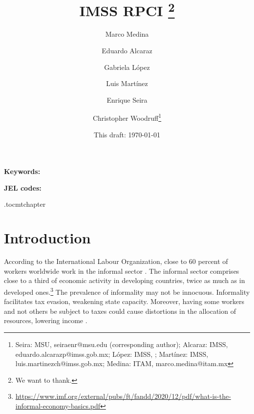 \documentclass[oneside,11pt]{article}
\begin{document}
\title{IMSS RPCI \thanks{We want to thank.}}
\author{Marco Medina \and Eduardo Alcaraz \and Gabriela López \and Luis Martínez \and Enrique Seira  \and Christopher Woodruff\thanks{Seira: MSU, seiraenr@msu.edu (corresponding author); Alcaraz: IMSS, eduardo.alcarazp@imss.gob.mx; López: IMSS, ; Martínez: IMSS, luis.martinezch@imss.gob.mx; Medina:  ITAM, marco.medina@itam.mx}}
\date{This draft:  \today \\[2 cm]}



\maketitle
\thispagestyle{empty}
\begin{abstract}


\end{abstract}

\vspace{.3in}

\textbf{Keywords: }

\textbf{JEL codes:}

\newpage

\etocdepthtag.toc{mtchapter}

\section{Introduction} \label{introduction}

According to the International Labour Organization, close to 60 percent of workers worldwide work in the informal sector \citep{ILO_2018}. The informal sector comprises close to a third of economic activity in developing countries, twice as much as in developed ones.\footnote{\url{https://www.imf.org/external/pubs/ft/fandd/2020/12/pdf/what-is-the-informal-economy-basics.pdf}} The prevalence of informality may not be innocuous. Informality facilitates tax evasion, weakening state capacity. Moreover, having some workers and not others be subject to taxes could cause distortions in the allocation of resources, lowering income \citep{Misallocation}. 
\end{document}
